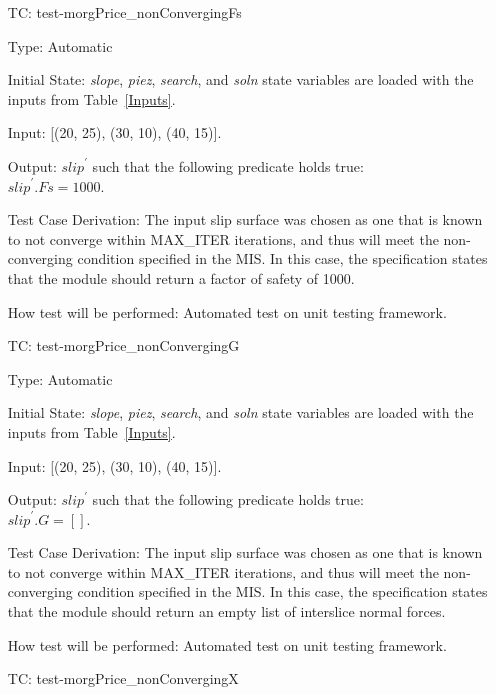 \documentclass[12pt, titlepage]{article}
\newcounter{utestnum} %
\begin{document}
\begin{enumerate}[label=TC\arabic*:,ref={\arabic*}]
	
	\item [TC\refstepcounter{utestnum}\theutestnum: 
	\label{TC_MorgPriceNonConvergingFs}] 
	test-morgPrice\_nonConvergingFs
	
	Type: Automatic
	
	Initial State: \textit{slope}, \textit{piez}, \textit{search}, and 
	\textit{soln} state variables are loaded with the inputs from 
	Table~\ref{Inputs}.
	
	Input: [(20, 25), (30, 10), (40, 15)].
	
	Output: $\textit{slip}^\prime$ such that the following predicate holds 
	true:\\ 
	$\textit{slip}^\prime.\textit{Fs} = 1000$.
	
	Test Case Derivation: The input slip surface was chosen as one that is 
	known to not converge within MAX\_ITER iterations, and thus will meet the 
	non-converging condition specified in the MIS. In this case, the 
	specification states that the module should return a factor of safety of 
	1000.
	
	How test will be performed: Automated test on unit testing framework.
	
	\item [TC\refstepcounter{utestnum}\theutestnum: 
	\label{TC_MorgPriceNonConvergingG}] 
	test-morgPrice\_nonConvergingG
	
	Type: Automatic
	
	Initial State: \textit{slope}, \textit{piez}, \textit{search}, and 
	\textit{soln} state variables are loaded with the inputs from 
	Table~\ref{Inputs}.
	
	Input: [(20, 25), (30, 10), (40, 15)].
	
	Output: $\textit{slip}^\prime$ such that the following predicate holds 
	true:\\ 
	$\textit{slip}^\prime.\textit{G} = []$.
	
	Test Case Derivation: The input slip surface was chosen as one that is 
	known to not converge within MAX\_ITER iterations, and thus will meet the 
	non-converging condition specified in the MIS. In this case, the 
	specification states that the module should return an empty list of 
	interslice normal forces.
	
	How test will be performed: Automated test on unit testing framework.
	
	\item [TC\refstepcounter{utestnum}\theutestnum: 
	\label{TC_MorgPriceNonConvergingX}] 
	test-morgPrice\_nonConvergingX
	

\end{enumerate}
\end{document}
